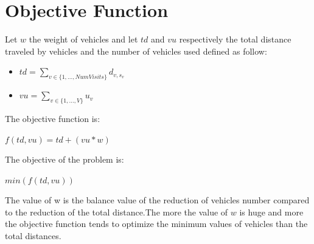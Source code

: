 \section{Objective Function}
Let \begin{math}w\end{math} the weight of vehicles and let \begin{math} td\end{math} and \begin{math}vu\end{math} respectively the total distance traveled by vehicles and the number of vehicles used defined as follow: 
\begin{itemize}
    \item \begin{math}td = \sum_{v \in \{1,...,NumVisits\}}d_{v, s_{v}}\end{math}
    \item \begin{math}vu = \sum_{v \in \{1,...,V\}}u_{v}\end{math}
\end{itemize}
The objective function is:
\begin{center}
    \begin{math}f(td,vu) = td + (vu * w)\end{math}
\end{center}
The objective of the problem is:
\begin{center}
    \begin{math}min(f(td,vu))\end{math}
\end{center}
The value of w is the balance value of the reduction of vehicles number compared to the reduction of the total distance.The more the value of \begin{math}w\end{math} is huge and more the objective function tends to optimize the minimum values of vehicles than the total distances.

